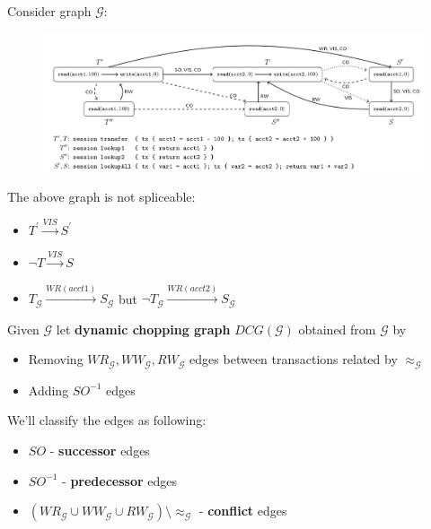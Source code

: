 \documentclass{beamer}
\begin{document}
\begin{frame}
	Consider graph $\mathcal{G}$:
	\begin{figure}
		\includegraphics[scale=0.28]{fig4}
	\end{figure}
	\begin{example}
		The above graph is not spliceable:
		\begin{itemize}
			\item $T^\prime \xrightarrow{VIS} S^\prime$
			\item $\neg T \xrightarrow{VIS} S$
			\item $\boxed{T}_\mathcal{G} \xrightarrow{WR(acct1)} \boxed{S}_\mathcal{G}$ but $\neg \boxed{T}_\mathcal{G} \xrightarrow{WR(acct2)} \boxed{S}_\mathcal{G}$
		\end{itemize}
	\end{example}
\end{frame}

\begin{frame}
	\begin{definition}
		Given $\mathcal{G}$ let \textbf{dynamic chopping graph} $DCG(\mathcal{G})$ obtained from $\mathcal{G}$ by
		\begin{itemize}
			\item Removing $WR_\mathcal{G}, WW_\mathcal{G}, RW_\mathcal{G}$ edges between transactions related by $\approx_\mathcal{G}$
			\item Adding $SO^{-1}$ edges
		\end{itemize}
		\pause
		We'll classify the edges as following:
		\begin{itemize}
			\item $SO$ - \textbf{successor} edges
			\item $SO^{-1}$ - \textbf{predecessor} edges
			\item $\left( WR_\mathcal{G} \cup WW_\mathcal{G} \cup RW_\mathcal{G} \right) \setminus \approx_\mathcal{G}$ - \textbf{conflict} edges
		\end{itemize}
	\end{definition}
\end{frame}
\end{document}
